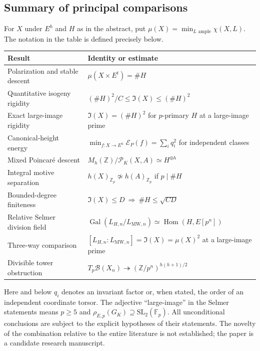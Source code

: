 \documentclass[11pt,a4paper]{article}
\theoremstyle{definition}\newtheorem{definition}[theorem]{Definition}
\theoremstyle{remark}\newtheorem{remark}[theorem]{Remark}
\newcommand{\ZZ}{\mathbb Z}\newcommand{\QQ}{\mathbb Q}\newcommand{\FF}{\mathbb F}
\newcommand{\Gal}{\operatorname{Gal}}\newcommand{\Hom}{\operatorname{Hom}}\newcommand{\End}{\operatorname{End}}\newcommand{\Pic}{\operatorname{Pic}}\newcommand{\NS}{\operatorname{NS}}\newcommand{\Br}{\operatorname{Br}}\newcommand{\Sel}{\operatorname{Sel}}\newcommand{\ord}{\operatorname{ord}}\newcommand{\rk}{\operatorname{rank}}\newcommand{\corank}{\operatorname{corank}}\newcommand{\length}{\operatorname{length}}\newcommand{\Sym}{\operatorname{Sym}}\newcommand{\Cl}{\operatorname{Cl}}\newcommand{\coker}{\operatorname{coker}}\newcommand{\I}{\mathfrak I}\newcommand{\D}{\mathfrak D}\newcommand{\Tdef}{\mathfrak T}
\numberwithin{equation}{section}
\begin{document}
\subsection*{Summary of principal comparisons}
For $X$ under $E^h$ and $H$ as in the abstract, put $\mu(X)=\min_{L\text{ ample}}\chi(X,L)$. The notation in the table is defined precisely below.
\begin{center}\small
\begin{tabularx}{\textwidth}{@{}p{}X@{}}
\toprule
\textbf{Result} & \textbf{Identity or estimate}\\ \midrule
Polarization and stable descent & $\mu(X\times E^t)=\#H$\\[3pt]
Quantitative isogeny rigidity & $(\#H)^2/C\leq\I(X)\leq(\#H)^2$\\[3pt]
Exact large-image rigidity & $\I(X)=(\#H)^2$ for $p$-primary $H$ at a large-image prime\\[3pt]
Canonical-height energy & $\min_{f:X\to E^h}\mathcal E_P(f)=\sum_i q_i^2$ for independent classes\\[3pt]
Mixed Poincar\'{e} descent & $M_h(\ZZ)/\mathcal P_K(X,A)\simeq H^{\oplus h}$\\[3pt]
Integral motive separation & $h(X)_{\ZZ_p}\not\simeq h(A)_{\ZZ_p}$ if $p\mid\#H$\\[3pt]
Bounded-degree finiteness & $\I(X)\leq D\ \Rightarrow\ \#H\leq\sqrt{CD}$\\[3pt]
Relative Selmer division field & $\Gal(L_{H,n}/L_{\mathrm{MW},n})\simeq\Hom(H,E[p^n])$\\[3pt]
Three-way comparison & $[L_{H,n}:L_{\mathrm{MW},n}]=\I(X)=\mu(X)^2$ at a large-image prime\\[3pt]
Divisible tower obstruction & $T_p\mathcal B(X_n)\twoheadrightarrow(\ZZ/p^n)^{h(h+1)/2}$\\
\bottomrule
\end{tabularx}
\end{center}
Here and below $q_i$ denotes an invariant factor or, when stated, the order of an independent coordinate torsor. The adjective ``large-image'' in the Selmer statements means $p\geq5$ and $\rho_{E,p}(G_K)\supseteq\mathrm{SL}_2(\FF_p)$. All unconditional conclusions are subject to the explicit hypotheses of their statements. The novelty of the combination relative to the entire literature is not established; the paper is a candidate research manuscript.
\end{document}
